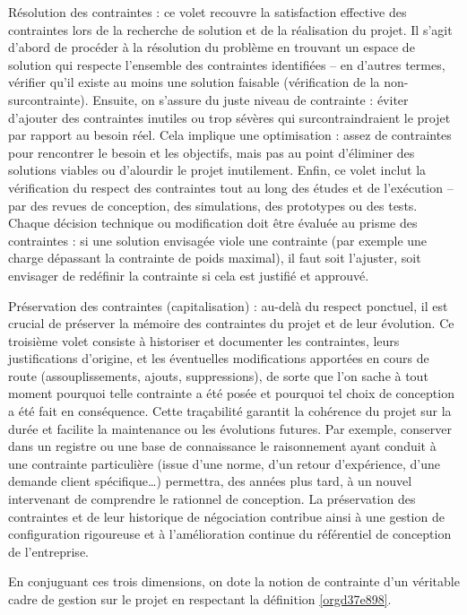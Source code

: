 \documentclass[a4paper,12pt]{article}
\begin{document}
Résolution des contraintes : ce volet recouvre la satisfaction effective des contraintes lors de la recherche de solution et de la réalisation du projet. Il s’agit d’abord de procéder à la résolution du problème en trouvant un espace de solution qui respecte l’ensemble des contraintes identifiées – en d’autres termes, vérifier qu’il existe au moins une solution faisable (vérification de la non-surcontrainte). Ensuite, on s’assure du juste niveau de contrainte : éviter d’ajouter des contraintes inutiles ou trop sévères qui surcontraindraient le projet par rapport au besoin réel. Cela implique une optimisation : assez de contraintes pour rencontrer le besoin et les objectifs, mais pas au point d’éliminer des solutions viables ou d’alourdir le projet inutilement. Enfin, ce volet inclut la vérification du respect des contraintes tout au long des études et de l’exécution – par des revues de conception, des simulations, des prototypes ou des tests. Chaque décision technique ou modification doit être évaluée au prisme des contraintes : si une solution envisagée viole une contrainte (par exemple une charge dépassant la contrainte de poids maximal), il faut soit l’ajuster, soit envisager de redéfinir la contrainte si cela est justifié et approuvé.

Préservation des contraintes (capitalisation) : au-delà du respect ponctuel, il est crucial de préserver la mémoire des contraintes du projet et de leur évolution. Ce troisième volet consiste à historiser et documenter les contraintes, leurs justifications d’origine, et les éventuelles modifications apportées en cours de route (assouplissements, ajouts, suppressions), de sorte que l’on sache à tout moment pourquoi telle contrainte a été posée et pourquoi tel choix de conception a été fait en conséquence. Cette traçabilité garantit la cohérence du projet sur la durée et facilite la maintenance ou les évolutions futures. Par exemple, conserver dans un registre ou une base de connaissance le raisonnement ayant conduit à une contrainte particulière (issue d’une norme, d’un retour d’expérience, d’une demande client spécifique…) permettra, des années plus tard, à un nouvel intervenant de comprendre le rationnel de conception. La préservation des contraintes et de leur historique de négociation contribue ainsi à une gestion de configuration rigoureuse et à l’amélioration continue du référentiel de conception de l’entreprise.

En conjuguant ces trois dimensions, on dote la notion de contrainte d’un véritable cadre de gestion sur le projet en respectant la définition \ref{orgd37e898}.
\end{document}
